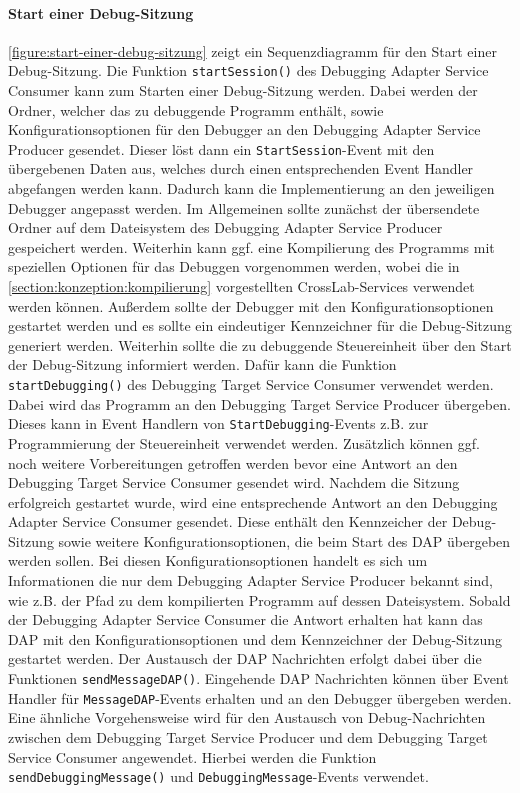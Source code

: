 \paragraph{Start einer Debug-Sitzung} \autoref{figure:start-einer-debug-sitzung} zeigt ein Sequenzdiagramm für den Start einer Debug-Sitzung. Die Funktion \texttt{startSession()} des Debugging Adapter Service Consumer kann zum Starten einer Debug-Sitzung werden. Dabei werden der Ordner, welcher das zu debuggende Programm enthält, sowie Konfigurationsoptionen für den Debugger an den Debugging Adapter Service Producer gesendet. Dieser löst dann ein \texttt{StartSession}-Event mit den übergebenen Daten aus, welches durch einen entsprechenden Event Handler abgefangen werden kann. Dadurch kann die Implementierung an den jeweiligen Debugger angepasst werden. Im Allgemeinen sollte zunächst der übersendete Ordner auf dem Dateisystem des Debugging Adapter Service Producer gespeichert werden. Weiterhin kann ggf. eine Kompilierung des Programms mit speziellen Optionen für das Debuggen vorgenommen werden, wobei die in \autoref{section:konzeption:kompilierung} vorgestellten CrossLab-Services verwendet werden können. Außerdem sollte der Debugger mit den Konfigurationsoptionen gestartet werden und es sollte ein eindeutiger Kennzeichner für die Debug-Sitzung generiert werden. Weiterhin sollte die zu debuggende Steuereinheit über den Start der Debug-Sitzung informiert werden. Dafür kann die Funktion \texttt{startDebugging()} des Debugging Target Service Consumer verwendet werden. Dabei wird das Programm an den Debugging Target Service Producer übergeben. Dieses kann in Event Handlern von \texttt{StartDebugging}-Events z.B. zur Programmierung der Steuereinheit verwendet werden. Zusätzlich können ggf. noch weitere Vorbereitungen getroffen werden bevor eine Antwort an den Debugging Target Service Consumer gesendet wird. Nachdem die Sitzung erfolgreich gestartet wurde, wird eine entsprechende Antwort an den Debugging Adapter Service Consumer gesendet. Diese enthält den Kennzeicher der Debug-Sitzung sowie weitere Konfigurationsoptionen, die beim Start des \ac{DAP} übergeben werden sollen. Bei diesen Konfigurationsoptionen handelt es sich um Informationen die nur dem Debugging Adapter Service Producer bekannt sind, wie z.B. der Pfad zu dem kompilierten Programm auf dessen Dateisystem. Sobald der Debugging Adapter Service Consumer die Antwort erhalten hat kann das \ac{DAP} mit den Konfigurationsoptionen und dem Kennzeichner der Debug-Sitzung gestartet werden. Der Austausch der \ac{DAP} Nachrichten erfolgt dabei über die Funktionen \texttt{sendMessageDAP()}. Eingehende \ac{DAP} Nachrichten können über Event Handler für \texttt{MessageDAP}-Events erhalten und an den Debugger übergeben werden. Eine ähnliche Vorgehensweise wird für den Austausch von Debug-Nachrichten zwischen dem Debugging Target Service Producer und dem Debugging Target Service Consumer angewendet. Hierbei werden die Funktion \texttt{sendDebuggingMessage()} und \texttt{DebuggingMessage}-Events verwendet.

